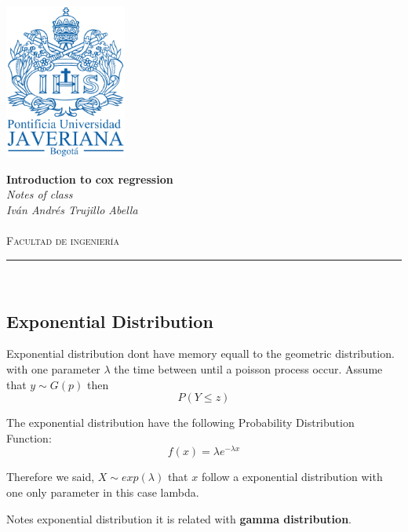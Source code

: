 \documentclass[10pt,a4paper]{article}
\author{Iván Andrés Trujillo }
\begin{document}
\newcommand{\HRule}{\rule{\linewidth}{0.5mm}}


\includegraphics[width = 4cm]{pujshield.eps}\\[0.5cm] 

\begin{center} 
\textbf{\LARGE Introduction to cox regression}\\[0.2cm]
\emph{\LARGE Notes of class}\\[0.3cm] 
\emph{Iván Andrés Trujillo Abella} \\
\textsc{\Large 
}\\[0.2cm] 
\textsc{\large Facultad de ingeniería}\\[0.5cm] 
\HRule \\[0.4cm]
\end{center}
\vspace{1cm}





\subsection{Exponential Distribution}
Exponential distribution dont have memory equall to the geometric distribution.
with one parameter $\lambda$  the time between until a  poisson process occur.
Assume that $y \sim G(p)$ then
$$ P(Y \leq z) 	$$


The exponential distribution have the following Probability Distribution Function:
$$f(x)=\lambda e^{- \lambda x}$$
 
Therefore we said, $ X \sim exp(\lambda)$ that $x$ follow a exponential distribution
with one only parameter in this case lambda. 



Notes exponential distribution it is related with \textbf{gamma distribution}.
\end{document}
